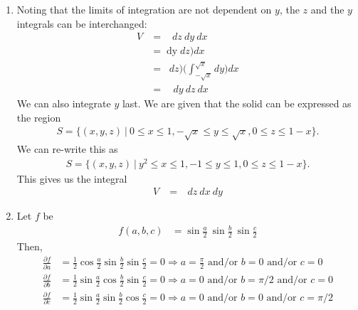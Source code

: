 \documentclass{article}
\begin{document}
\begin{enumerate}
\item %
Noting that the limits of integration are not dependent on $y$, the $z$ and the $y$ integrals can be interchanged:
\begin{align*}
  V &= \mathop{\int_{0}^{1} \!\! \int_{-\sqrt{x}}^{\sqrt{x}} \! \int_0^{1-x} } dz\ dy\ dx \\
   &= \mathop{\int_{0}^{1} \Bigg( \int_{-\sqrt{x}}^{\sqrt{x}} dy \Bigg) \Bigg( \int_0^{1-x} } dz\Bigg) dx \\
   &= \mathop{\int_{0}^{1}  \Bigg( \int_0^{1-x} } dz\Bigg) \Bigg( \int_{-\sqrt{x}}^{\sqrt{x}} dy \Bigg)dx \\
   &= \mathop{\int_{0}^{1} \!\! \int_0^{1-x} \!\! \int_{-\sqrt{x}}^{\sqrt{x}}} dy\ dz\ dx 
\end{align*}
We can also integrate $y$ last. We are given that the solid can be expressed as the region 
\begin{align*}
  S = \{(x,y,z)\ |\  0 \le x \le 1, -\sqrt{x} \le y \le \sqrt{x}, 0 \le z \le 1-x \}.
\end{align*}
We can re-write this as
\begin{align*}
  S = \{(x,y,z)\ |\  y^2 \le x \le 1, -1 \le y \le 1, 0 \le z \le 1-x \}.
\end{align*}
This gives us the integral
\begin{align*}
  V &= \mathop{\int_{-1}^{1} \! \int_{y^2}^{1} \! \int_0^{1-x} } dz\ dx\ dy
\end{align*}
\item %
Let $f$ be
\begin{align*}
  f(a,b,c) &=  \sin\frac{a}{2} \ \sin\frac{b}{2} \ \sin\frac{c}{2}
\end{align*}
Then,
\begin{align*}
  \frac{\partial f}{\partial a} &=  \frac{1}{2}\cos\frac{a}{2}  \sin\frac{b}{2}  \sin\frac{c}{2} =0 \Rightarrow a=\frac{\pi}{2} \text{ and/or } b=0\text{ and/or } c=0\\
  \frac{\partial f}{\partial b} &=  \frac{1}{2}\sin\frac{a}{2}  \cos\frac{b}{2}  \sin\frac{c}{2} =0 \Rightarrow a=0 \text{ and/or } b=\pi/2\text{ and/or } c=0\\
  \frac{\partial f}{\partial c} &=  \frac{1}{2}\sin\frac{a}{2}  \sin\frac{b}{2}  \cos\frac{c}{2} =0 \Rightarrow a=0 \text{ and/or } b=0\text{ and/or } c=\pi/2    
\end{align*}

\end{enumerate}
\end{document}
